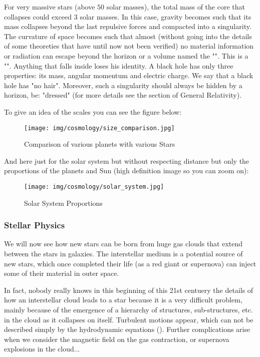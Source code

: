 	For very massive stars (above $50$ solar masses), the total mass of the core that collapses could exceed $3$ solar masses. In this case, gravity becomes such that its mass collapses beyond the last repulsive forces and compacted into a singularity. The curvature of space becomes such that almost (without going into the details of some theoreties that have until now not been verified) no material information or radiation can escape beyond the horizon or a volume named the "". This is a "". Anything that falls inside loses his identity. A black hole has only three properties: its mass, angular momentum and electric charge. We say that a black hole has "no hair". Moreover, such a singularity should always be hidden by a horizon, be: "dressed" (for more details see the section of General Relativity).
	
	To give an idea of the scales you can see the figure below:
	\begin{figure}[H]
		\begin{center}
		\texttt{[image: img/cosmology/size\_comparison.jpg]}
		\end{center}	
		\caption{Comparison of various planets with various Stars}
	\end{figure}
	And here just for the solar system but without respecting distance but only the proportions of the planets and Sun (high definition image so you can zoom on):
	\begin{figure}[H]
		\begin{center}
		\texttt{[image: img/cosmology/solar\_system.jpg]}
		\end{center}	
		\caption{Solar System Proportions}
	\end{figure}
	
	\pagebreak
	\subsubsection{Stellar Physics}
	We will now see how new stars can be born from huge gas clouds that extend between the stars in galaxies. The interstellar medium is a potential source of new stars, which once completed their life (as a red giant or supernova) can inject some of their material in outer space.

	In fact, nobody really knows in this beginning of this 21st centuery the details of how an interstellar cloud leads to a star because it is a very difficult problem, mainly because of the emergence of a hierarchy of structures, sub-structures, etc. in the cloud as it collapses on itself. Turbulent motions appear, which can not be described simply by the hydrodynamic equations (). Further complications arise when we consider the magnetic field on the gas contraction, or supernova explosions in the cloud...

